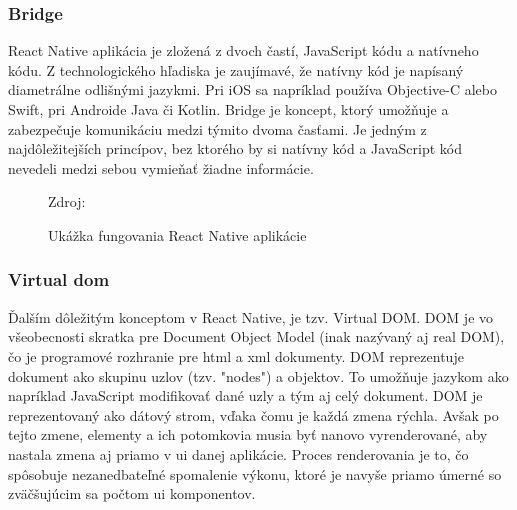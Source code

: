 \subsubsection{Bridge}
React Native aplikácia je zložená z dvoch častí, JavaScript kódu a natívneho kódu. Z technologického hľadiska je zaujímavé, že natívny kód je napísaný diametrálne odlišnými jazykmi. Pri iOS sa napríklad používa Objective-C alebo Swift, pri Androide Java či Kotlin. Bridge je koncept, ktorý umožňuje a zabezpečuje komunikáciu medzi týmito dvoma časťami. Je jedným z najdôležitejších princípov, bez ktorého by si natívny kód a JavaScript kód nevedeli medzi sebou vymieňať žiadne informácie. \cite{rn3}
\begin{figure}[!htbp]
  \centering  
  \def\stackalignment{c}
           {\scriptsize%
            Zdroj: \cite{udemy}}
	\caption{Ukážka fungovania React Native aplikácie}  
  \label{reactAppExplained}
\end{figure}
\subsubsection{Virtual \acrfull{dom}}
Ďalším dôležitým konceptom v React Native, je tzv. Virtual DOM. DOM je vo všeobecnosti skratka pre Document Object Model (inak nazývaný aj real DOM), čo je programové rozhranie pre \acrshort{html} a \acrshort{xml} dokumenty. DOM reprezentuje dokument ako skupinu uzlov (tzv. "nodes") a objektov. To umožňuje jazykom ako napríklad JavaScript modifikovať dané uzly a tým aj celý dokument. DOM je reprezentovaný ako dátový strom, vďaka čomu je každá zmena rýchla. Avšak po tejto zmene, elementy a ich potomkovia musia byť nanovo vyrenderované, aby nastala zmena aj priamo v \acrshort{ui} danej aplikácie. Proces renderovania je to, čo spôsobuje nezanedbateľné spomalenie výkonu, ktoré je navyše priamo úmerné so zväčšujúcim sa počtom \acrshort{ui} komponentov.

